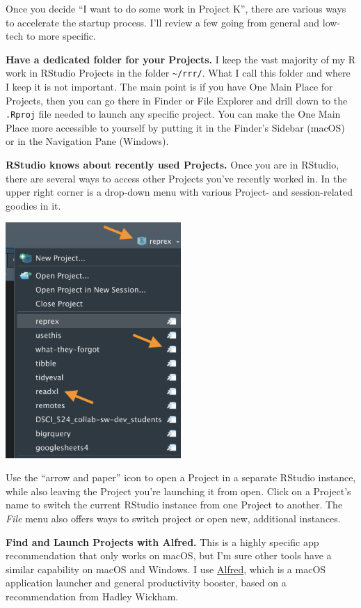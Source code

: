 \documentclass[
  letterpaper,
]{book}
\begin{document}
Once you decide ``I want to do some work in Project K'', there are
various ways to accelerate the startup process. I'll review a few going
from general and low-tech to more specific.

\textbf{Have a dedicated folder for your Projects.} I keep the vast
majority of my R work in RStudio Projects in the folder
\texttt{\textasciitilde{}/rrr/}. What I call this folder and where I
keep it is not important. The main point is if you have One Main Place
for Projects, then you can go there in Finder or File Explorer and drill
down to the \texttt{.Rproj} file needed to launch any specific project.
You can make the One Main Place more accessible to yourself by putting
it in the Finder's Sidebar (macOS) or in the Navigation Pane (Windows).

\textbf{RStudio knows about recently used Projects.} Once you are in
RStudio, there are several ways to access other Projects you've recently
worked in. In the upper right corner is a drop-down menu with various
Project- and session-related goodies in it.

\includegraphics[width=0.5\textwidth,height=\textheight]{./img/rstudio-project-switching.png}

Use the ``arrow and paper'' icon to open a Project in a separate RStudio
instance, while also leaving the Project you're launching it from open.
Click on a Project's name to switch the current RStudio instance from
one Project to another. The \emph{File} menu also offers ways to switch
project or open new, additional instances.

\textbf{Find and Launch Projects with Alfred.} This is a highly specific
app recommendation that only works on macOS, but I'm sure other tools
have a similar capability on macOS and Windows. I use
\href{https://www.alfredapp.com}{Alfred}, which is a macOS application
launcher and general productivity booster, based on a recommendation
from Hadley Wickham.
\end{document}
